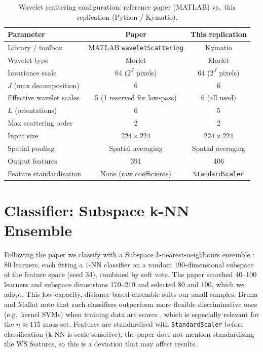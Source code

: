 \begin{table}[h]
\centering
\caption[Wavelet scattering configuration: paper versus this replication]{Wavelet scattering configuration: reference paper (MATLAB) vs.\ this replication (Python / Kymatio).}
\label{tab:ws_config}
\begin{tabular}{lcc}
\toprule
\textbf{Parameter} & \textbf{Paper \cite{razali2023cnn}} & \textbf{This replication} \\
\midrule
Library / toolbox         & MATLAB \texttt{waveletScattering} & Kymatio \cite{andreux2020kymatio} \\
Wavelet type              & Morlet                            & Morlet \\
Invariance scale          & 64 ($2^J$ pixels)                 & 64 ($2^J$ pixels) \\
$J$ (max decomposition)   & 6                                 & 6 \\
Effective wavelet scales  & 5 (1 reserved for low-pass)       & 6 (all used) \\
$L$ (orientations)        & 6                                 & 5 \\
Max scattering order      & 2                                 & 2 \\
Input size                & $224 \times 224$                  & $224 \times 224$ \\
Spatial pooling           & Spatial averaging                 & Spatial averaging \\
Output features           & 391                               & 406 \\
Feature standardisation   & None (raw coefficients)           & \texttt{StandardScaler} \\
\bottomrule
\end{tabular}
\end{table}


\section{Classifier: Subspace k-NN Ensemble} \label{sec:classifier}

Following the paper we classify with a Subspace $k$-nearest-neighbours ensemble \cite{ho1998random, cover1967nearest}: 80 learners, each fitting a 1-NN classifier on a random 190-dimensional subspace of the feature space (seed 34), combined by soft vote. The paper searched 40--100 learners and subspace dimensions 170--210 and selected 80 and 190, which we adopt. This low-capacity, distance-based ensemble suits our small samples: Bruna and Mallat note that such classifiers outperform more flexible discriminative ones (e.g.\ kernel SVMs) when training data are scarce \cite{bruna2013invariant}, which is especially relevant for the $n\approx115$ mass set. Features are standardised with \texttt{StandardScaler} \cite{pedregosa2011scikit} before classification (k-NN is scale-sensitive); the paper does not mention standardising the WS features, so this is a deviation that may affect results.

